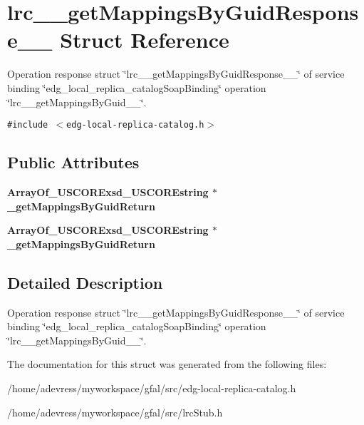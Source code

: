 \section{lrc\_\-\_\-get\-Mappings\-By\-Guid\-Response\_\-\_\- Struct Reference}
\label{structlrc____getMappingsByGuidResponse____}
Operation response struct \char`\"{}lrc\_\-\_\-get\-Mappings\-By\-Guid\-Response\_\-\_\-\char`\"{} of service binding \char`\"{}edg\_\-local\_\-replica\_\-catalog\-Soap\-Binding\char`\"{} operation \char`\"{}lrc\_\-\_\-get\-Mappings\-By\-Guid\_\-\_\-\char`\"{}.  


{\tt \#include $<$edg-local-replica-catalog.h$>$}

\subsection*{Public Attributes}
\begin{CompactItemize}
\item 
\bf{Array\-Of\_\-USCORExsd\_\-USCOREstring} $\ast$ \textbf{\_\-get\-Mappings\-By\-Guid\-Return}\label{structlrc____getMappingsByGuidResponse_____ba934ac21051148e9be7793af9593e1c}

\item 
\bf{Array\-Of\_\-USCORExsd\_\-USCOREstring} $\ast$ \textbf{\_\-get\-Mappings\-By\-Guid\-Return}\label{structlrc____getMappingsByGuidResponse_____ba934ac21051148e9be7793af9593e1c}

\end{CompactItemize}


\subsection{Detailed Description}
Operation response struct \char`\"{}lrc\_\-\_\-get\-Mappings\-By\-Guid\-Response\_\-\_\-\char`\"{} of service binding \char`\"{}edg\_\-local\_\-replica\_\-catalog\-Soap\-Binding\char`\"{} operation \char`\"{}lrc\_\-\_\-get\-Mappings\-By\-Guid\_\-\_\-\char`\"{}. 



The documentation for this struct was generated from the following files:\begin{CompactItemize}
\item 
/home/adevress/myworkspace/gfal/src/edg-local-replica-catalog.h\item 
/home/adevress/myworkspace/gfal/src/lrc\-Stub.h\end{CompactItemize}
